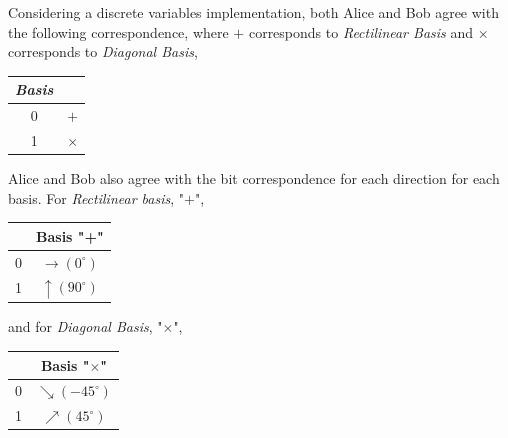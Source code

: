 Considering a discrete variables implementation, both Alice and Bob agree with the following correspondence, where $+$ corresponds to \textit{Rectilinear Basis} and $\times$ corresponds to \textit{Diagonal Basis},

\begin{table}[H]
\centering
\begin{tabular}{c|c}
\textbf{\textit{Basis}}         &  \\ \hline
 0 & $+$ \\
 1 & $\times$ \\
\end{tabular}
\end{table}
Alice and Bob also agree with the bit correspondence for each direction for each basis. For \textit{Rectilinear basis}, "$+$",

\begin{table}[H]
\centering
\begin{tabular}{c|c}
            & Basis "+" \\ \hline
 0 & $\to (0^{\circ})$ \\
 1 & $\uparrow (90^{\circ})$ \\
\end{tabular}
\end{table}
and for \textit{Diagonal Basis}, "$\times$",

\begin{table}[H]
\centering
\begin{tabular}{c|c}
      & Basis "$\times$" \\ \hline
 0 & $\searrow (-45^{\circ})$ \\
 1 & $\nearrow (45^{\circ})$ \\
\end{tabular}
\end{table}

